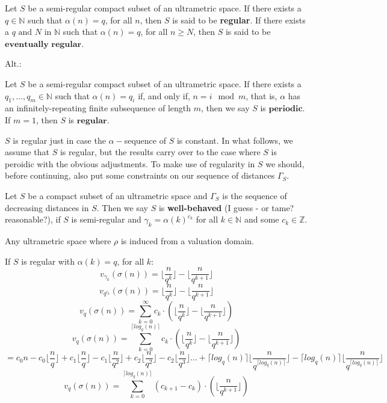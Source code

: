 \begin{definition*}
Let $S$ be a semi-regular compact subset of an ultrametric space. If there exists a $q \in \mathbb{N}$ such that $\alpha(n) = q$, for all $n$, then $S$ is said to be \textbf{regular}. If there exists a $q \text{ and } N$ in $\mathbb{N}$ such that $\alpha(n) = q$, for all $n \geq N$, then $S$ is said to be $\textbf{eventually regular}$.
\end{definition*}

Alt.:
\begin{definition*}
Let $S$ be a semi-regular compact subset of an ultrametric space. If there exists a $q_1,\ldots,q_m \in \mathbb{N}$ such that $\alpha(n) = q_i$ if, and only if, $n = i \mod m$, that is, $\alpha$ has an infinitely-repeating finite subsequence of length $m$, then we say $S$ is $\textbf{periodic}$. If $m=1$, then $S$ is $\textbf{regular}$. 
\end{definition*}

$S$ is regular just in case the $\alpha-$sequence of $S$ is constant. In what follows, we assume that $S$ is regular, but the results carry over to the case where $S$ is peroidic with the obvious adjustments. To make use of regularity in $S$ we should, before continuing, also put some constraints on our sequence of distances $\Gamma_S$.

\begin{definition*}
Let $S$ be a compact subset of an ultrametric space and $\Gamma_S$ is the sequence of decreasing distances in $S$. Then we say $S$ is \textbf{well-behaved} (I guess - or tame? reasonable?), if $S$ is semi-regular and $\gamma_k = \alpha(k)^{c_k}$ for all $k \in \mathbb{N}$ and some $c_k \in \mathbb{Z}$.
\end{definition*}

\begin{example}
Any ultrametric space where $\rho$ is induced from a valuation domain.
\end{example}

If $S$ is regular with $\alpha(k)=q$, for all $k$:
\[v_{\gamma_k}(\sigma(n)) =  \lfloor\frac{n}{q^k}\rfloor - \lfloor\frac{n}{q^{k+1}}\rfloor \]
\[v_{q^{c_k}}(\sigma(n)) =  \lfloor\frac{n}{q^k}\rfloor - \lfloor\frac{n}{q^{k+1}}\rfloor \]
\[v_{q}(\sigma(n)) =  \sum_{k=0}^{\infty} c_k \cdot(\lfloor\frac{n}{q^k}\rfloor - \lfloor\frac{n}{q^{k+1}}\rfloor) \]
\[v_{q}(\sigma(n)) =  \sum_{k=0}^{\lceil log_q(n) \rceil} c_k \cdot(\lfloor\frac{n}{q^k}\rfloor - \lfloor\frac{n}{q^{k+1}}\rfloor) \]
\[=  c_0{n} - c_0\lfloor\frac{n}{q}\rfloor + c_1\lfloor\frac{n}{q}\rfloor - c_1\lfloor\frac{n}{q^{2}}\rfloor  + c_2\lfloor\frac{n}{q^2}\rfloor - c_2\lfloor\frac{n}{q^{3}}\rfloor \ldots + \lceil log_q(n) \rceil \lfloor\frac{n}{q^{\lceil log_q(n) \rceil}}\rfloor - \lceil log_q(n) \rceil\lfloor\frac{n}{q^{\lceil log_q(n) \rceil}}\rfloor  \]
\[v_{q}(\sigma(n)) =  \sum_{k=0}^{\lceil log_q(n) \rceil} (c_{k+1} - c_k) \cdot(\lfloor\frac{n}{q^{k+1}}\rfloor) \]

